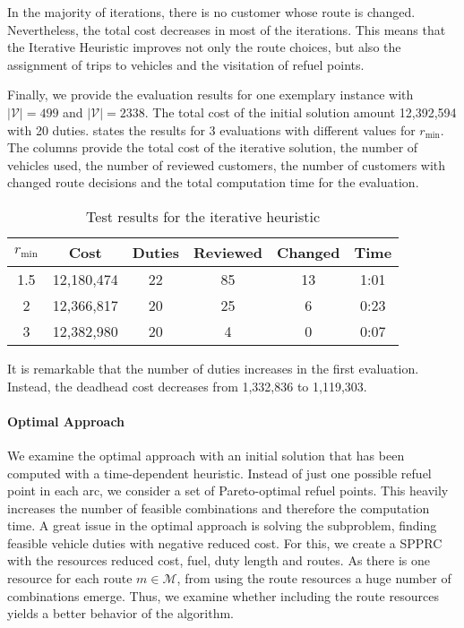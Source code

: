 In the majority of iterations, there is no customer whose route is changed. Nevertheless, the total cost decreases in most of the iterations. This means that the Iterative Heuristic improves not only the route choices, but also the assignment of trips to vehicles and the visitation of refuel points.

Finally, we provide the evaluation results for one exemplary instance with ${\vert\mathcal{V}\vert=499}$ and ${\vert\mathcal{V}\vert=2338}$. The total cost of the initial solution amount 12,392,594 with 20 duties.  states the results for 3 evaluations with different values for $r_{\min}$. The columns provide the total cost of the iterative solution, the number of vehicles used, the number of reviewed customers, the number of customers with changed route decisions and the total computation time for the evaluation.

\begin{table}[htb]
	\centering
	\begin{tabular}{cccccc}
		\toprule
		$r_{\min}$ & Cost & Duties & Reviewed & Changed & Time \\
		\midrule
		1.5 & 12,180,474 & 22 & 85 & 13 & 1:01 \\
		2   & 12,366,817 & 20 & 25 & 6  & 0:23 \\
		3   & 12,382,980 & 20 & 4  & 0  & 0:07 \\
		\bottomrule
	\end{tabular}
	\caption{Test results for the iterative heuristic}
	\label{tab:results:iterative}
\end{table}

It is remarkable that the number of duties increases in the first evaluation. Instead, the deadhead cost decreases from 1,332,836 to 1,119,303.

\paragraph{Optimal Approach} \parfill

We examine the optimal approach with an initial solution that has been computed with a time-dependent heuristic. Instead of just one possible refuel point in each arc, we consider a set of Pareto-optimal refuel points. This heavily increases the number of feasible combinations and therefore the computation time. A great issue in the optimal approach is solving the subproblem, \ie finding feasible vehicle duties with negative reduced cost. For this, we create a SPPRC with the resources reduced cost, fuel, duty length and routes. As there is one resource for each route ${m\in\mathcal{M}}$, from using the route resources a huge number of combinations emerge. Thus, we examine whether including the route resources yields a better behavior of the algorithm.

